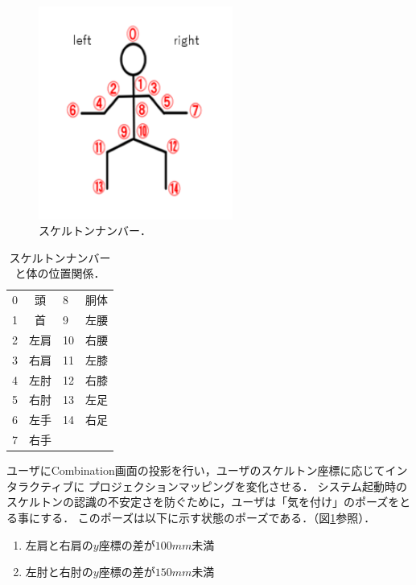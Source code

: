 \begin{figure}[htbp]
    \centering
    \includegraphics[height=7cm]{image/Skeleton_num.png}
    \caption[スケルトンナンバー]{スケルトンナンバー．}
  \label{num}
\end{figure}

\begin{table}[h]
    \centering
    \begin{tabular}{|lc|lc|} \hline
      0 & 頭 & 8 & 胴体 \\ 
      1 & 首 & 9 & 左腰 \\
      2 & 左肩 & 10 & 右腰 \\
      3 & 右肩 & 11 & 左膝 \\
      4 & 左肘 & 12 & 右膝 \\
      5 & 右肘 & 13 & 左足 \\
      6 & 左手 & 14 & 右足 \\
      7 & 右手 &  &  \\ \hline
    \end{tabular}
    \caption[スケルトンナンバーと体の位置関係]{スケルトンナンバーと体の位置関係．}
    \label{num}
\end{table}



ユーザにCombination画面の投影を行い，ユーザのスケルトン座標に応じてインタラクティブに
プロジェクションマッピングを変化させる\cite{busan}\cite{ijrte}．
システム起動時のスケルトンの認識の不安定さを防ぐために，ユーザは「気を付け」のポーズをとる事にする．
このポーズは以下に示す状態のポーズである．（図\ref{num}参照）．

\begin{enumerate}
    \item 左肩と右肩の$y$座標の差が$100mm$未満
    \item 左肘と右肘の$y$座標の差が$150mm$未満
\end{enumerate}


